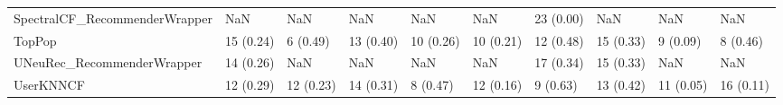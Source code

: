 \begin{tabular}{llllllllll}
      SpectralCF\_RecommenderWrapper &                      NaN &         NaN &           NaN &          NaN &                  NaN &           23 (0.00) &               NaN &                NaN &               NaN \\
                             TopPop &                15 (0.24) &    6 (0.49) &     13 (0.40) &    10 (0.26) &            10 (0.21) &           12 (0.48) &         15 (0.33) &           9 (0.09) &          8 (0.46) \\
         UNeuRec\_RecommenderWrapper &                14 (0.26) &         NaN &           NaN &          NaN &                  NaN &           17 (0.34) &         15 (0.33) &                NaN &               NaN \\
                          UserKNNCF &                12 (0.29) &   12 (0.23) &     14 (0.31) &     8 (0.47) &            12 (0.16) &            9 (0.63) &         13 (0.42) &          11 (0.05) &         16 (0.11) \\
\bottomrule
\end{tabular}
